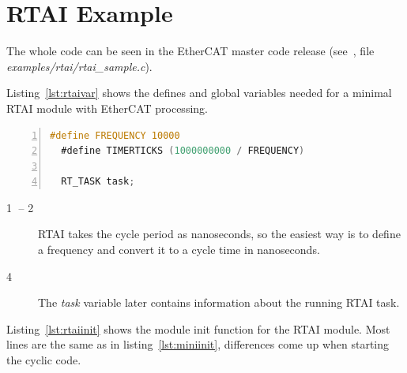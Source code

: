 \documentclass[a4paper,12pt,BCOR6mm,bibtotoc,idxtotoc]{scrbook}
\newcommand{\linenum}[1]{\normalfont\textcircled{\tiny #1}}
\begin{document}
\section{RTAI Example}
\label{sec:rtai}

The whole code can be seen in the EtherCAT master code release
(see~\cite{etherlab}, file \textit{examples/rtai/rtai\_sample.c}).

Listing~\ref{lst:rtaivar} shows the defines and global variables
needed for a minimal RTAI module with EtherCAT processing.

\begin{lstlisting}[gobble=2,language=C,numbers=left,caption={RTAI task
    declaration},label={lst:rtaivar}]
  #define FREQUENCY 10000
  #define TIMERTICKS (1000000000 / FREQUENCY)

  RT_TASK task;
\end{lstlisting}

\begin{description}
\item[\linenum{1} -- \linenum{2}] RTAI
  takes the cycle period as nanoseconds, so the easiest way is to
  define a frequency and convert it to a cycle time in nanoseconds.
\item[\linenum{4}] The \textit{task} variable
  later contains information about the running RTAI task.
\end{description}

Listing~\ref{lst:rtaiinit} shows the module init function for the RTAI
module. Most lines are the same as in listing~\ref{lst:miniinit},
differences come up when starting the cyclic code.
\end{document}
